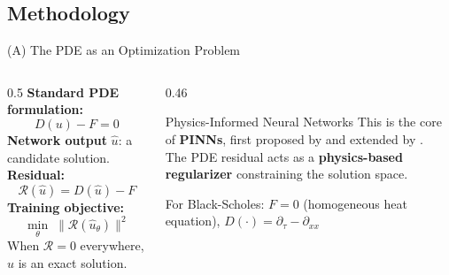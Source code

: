 \subsection{Methodology}
\begin{frame}{(A) The PDE as an Optimization Problem}
  \begin{columns}[T]
    \begin{column}{0.5\textwidth}
      \textbf{Standard PDE formulation:}
      \[
        D(u) - F = 0
      \]
      \textbf{Network output} $\hat{u}$: a candidate solution.\\[0.4em]
      \textbf{Residual:}
      \[
        \mathcal{R}(\hat{u}) = D(\hat{u}) - F
      \]
      \textbf{Training objective:}
      \[
        \min_{\theta} \; \|\mathcal{R}(\hat{u}_\theta)\|^2
      \]
      When $\mathcal{R} = 0$ everywhere, $\hat{u}$ is an exact solution.
    \end{column}
    \begin{column}{0.46\textwidth}
      \begin{block}{Physics-Informed Neural Networks}
        This is the core of \textbf{PINNs}, first proposed by \textcite{lagaris1998} and extended by \textcite{raissi2019}.\\[0.4em]
        The PDE residual acts as a \textbf{physics-based regularizer} constraining the solution space.
      \end{block}
      \vspace{0.3em}
      \footnotesize
      \textcolor{nngray}{For Black-Scholes: $F = 0$ (homogeneous heat equation), $D(\cdot) = \partial_\tau - \partial_{xx}$}
    \end{column}
  \end{columns}
\end{frame}
